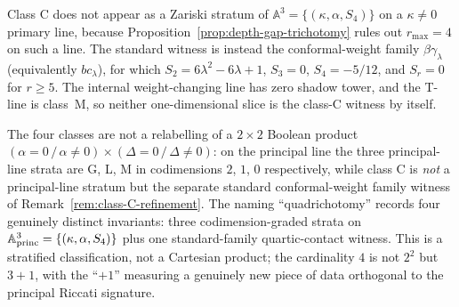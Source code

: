 \begin{remark}
\label{rem:class-C-refinement}
Class C does not appear as a Zariski stratum of
$\mathbb A^{3} = \{(\kappa, \alpha, S_4)\}$ on a
$\kappa \neq 0$ primary line, because
Proposition~\ref{prop:depth-gap-trichotomy} rules out
$r_{\max}=4$ on such a line. The standard witness is instead the
conformal-weight family $\beta\gamma_\lambda$
\textup{(}equivalently $bc_\lambda$\textup{)}, for which
$S_2 = 6\lambda^2 - 6\lambda + 1$, $S_3 = 0$, $S_4 = -5/12$,
and $S_r = 0$ for $r \ge 5$. The internal weight-changing line has
zero shadow tower, and the T-line is class~M, so neither
one-dimensional slice is the class-C witness by itself.
\end{remark}

\begin{remark}
\label{rem:quadrichotomy-stratification-not-boolean}
The four classes are not a relabelling of a
$2 \times 2$ Boolean product
$(\alpha = 0\,/\,\alpha \ne 0) \times
 (\Delta = 0\,/\,\Delta \ne 0)$: on the principal line the three
principal-line strata are G, L, M in codimensions $2$, $1$, $0$
respectively, while class C is \emph{not} a principal-line stratum
but the separate standard conformal-weight family witness of
Remark~\ref{rem:class-C-refinement}. The naming ``quadrichotomy''
records four genuinely distinct invariants: three codimension-graded
strata on $\mathbb A^{3}_{\rm princ} = \{(\kappa,\alpha,S_4)\}$ plus
one standard-family quartic-contact witness. This is a stratified
classification, not a Cartesian product; the cardinality $4$ is not
$2^2$ but $3 + 1$, with the ``$+1$'' measuring a genuinely new piece
of data orthogonal to the principal Riccati signature.
\end{remark}

